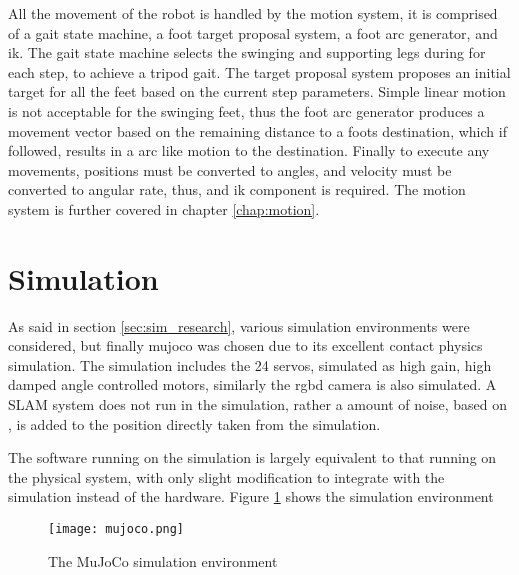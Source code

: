 All the movement of the robot is handled by the motion system, it is comprised of a gait state machine, a foot target proposal system, a foot arc generator, and \ac{ik}.
The gait state machine selects the swinging and supporting legs during for each step, to achieve a tripod gait. The target proposal system proposes an initial target for all the feet based
on the current step parameters. Simple linear motion is not acceptable for the swinging feet, thus the foot arc generator produces a movement vector based on the remaining distance to a foots destination,
which if followed, results in a arc like motion to the destination. Finally to execute any movements, positions must be converted to angles, and velocity must be converted to
angular rate, thus, and \ac{ik} component is required. The motion system is further covered in chapter \ref{chap:motion}.

\section{Simulation}
As said in section \ref{sec:sim_research}, various simulation environments were considered, but finally \ac{mujoco} was chosen due to its excellent contact physics
simulation. The simulation includes the 24 servos, simulated as high gain, high damped angle controlled motors, similarly the \ac{rgbd} camera is also simulated.
A SLAM system does not run in the simulation, rather a amount of noise, based on \cite{macario2022comprehensive}, is added to the position directly taken from the simulation.

The software running on the simulation is largely equivalent to that running on the physical system, with only slight modification to integrate with the simulation
instead of the hardware.
Figure \ref{fig:mujoco} shows the simulation environment
\begin{figure}[h]
    \centering
    \texttt{[image: mujoco.png]}
    \caption{The MuJoCo simulation environment}
    \label{fig:mujoco}
\end{figure}

